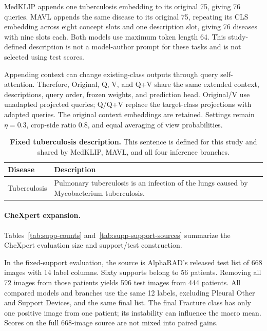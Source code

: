 MedKLIP appends one tuberculosis embedding to its original 75, giving 76 queries. MAVL appends the same disease to its original 75, repeating its CLS embedding across eight concept slots and one description slot, giving 76 diseases with nine slots each. Both models use maximum token length 64. This study-defined description is not a model-author prompt for these tasks and is not selected using test scores.

Appending context can change existing-class outputs through query self-attention. Therefore, Original, Q, V, and Q+V share the same extended context, descriptions, query order, frozen weights, and prediction head. Original/V use unadapted projected queries; Q/Q+V replace the target-class projections with adapted queries. The original context embeddings are retained. Settings remain $\eta=0.3$, crop-side ratio 0.8, and equal averaging of view probabilities.

\begin{table}[t]
\centering
\caption{\textbf{Fixed tuberculosis description.} This sentence is defined for this study and shared by MedKLIP, MAVL, and all four inference branches.}
\label{tab:supp-added-disease-prompts}
\footnotesize
\setlength{\tabcolsep}{4pt}
\begin{tabular*}{\textwidth}{@{\extracolsep{\fill}}lp{}@{}}
\toprule
Disease & Description \\
\midrule
Tuberculosis & Pulmonary tuberculosis is an infection of the lungs caused by Mycobacterium tuberculosis. \\
\bottomrule
\end{tabular*}
\end{table}

\paragraph{CheXpert expansion.}
Tables~\ref{tab:supp-counts} and~\ref{tab:supp-support-sources} summarize the CheXpert evaluation size and support/test construction.

In the fixed-support evaluation, the source is AlphaRAD's released test list of 668 images with 14 label columns. Sixty supports belong to 56 patients. Removing all 72 images from those patients yields 596 test images from 444 patients. All compared models and branches use the same 12 labels, excluding Pleural Other and Support Devices, and the same final list. The final Fracture class has only one positive image from one patient; its instability can influence the macro mean. Scores on the full 668-image source are not mixed into paired gains.

